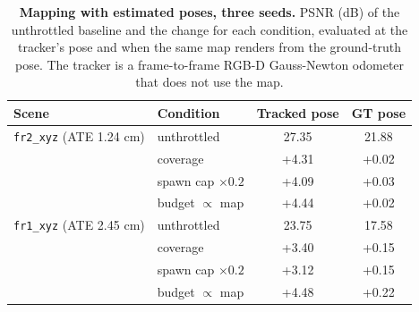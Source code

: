 \begin{table}[tbp]
\centering
\footnotesize\setlength{\tabcolsep}{2pt}
\begin{tabular}{llcc}
\toprule
\textbf{Scene} & \textbf{Condition} & \textbf{Tracked pose} & \textbf{GT pose} \\
\midrule
\texttt{fr2\_xyz} (ATE 1.24 cm) & unthrottled & 27.35 & 21.88 \\
 & coverage & +4.31 & +0.02 \\
 & spawn cap $\times0.2$ & +4.09 & +0.03 \\
 & budget $\propto$ map & +4.44 & +0.02 \\
\midrule
\texttt{fr1\_xyz} (ATE 2.45 cm) & unthrottled & 23.75 & 17.58 \\
 & coverage & +3.40 & +0.15 \\
 & spawn cap $\times0.2$ & +3.12 & +0.15 \\
 & budget $\propto$ map & +4.48 & +0.22 \\
\bottomrule
\end{tabular}
\caption{\textbf{Mapping with estimated poses, three seeds.} PSNR (dB) of the unthrottled baseline and the change for each condition, evaluated at the tracker's pose and when the same map renders from the ground-truth pose. The tracker is a frame-to-frame RGB-D Gauss-Newton odometer that does not use the map.}
\label{tab:tracked}
\end{table}
